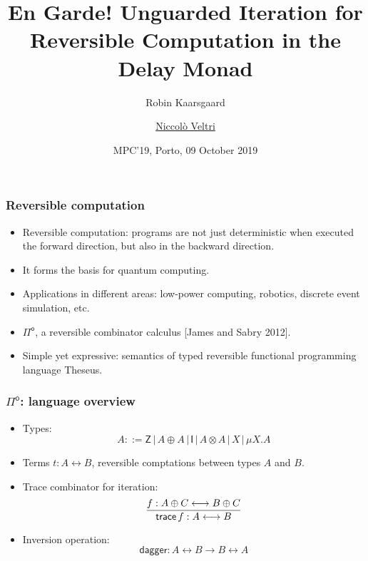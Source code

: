\documentclass[12pt,t]{beamer}
\newcommand{\Pio}{\ensuremath{\mathsf{\Pi}^{\mathsf{o}}}}
\newcommand{\lr}{\longleftrightarrow}
\newcommand{\trace}{\ensuremath{\mathsf{trace}}}
\newcommand{\Z}{\mathsf{Z}}
\newcommand{\I}{\mathsf{I}}
\renewcommand{\dagger}{\mathsf{dagger}}
\begin{document}

\title{En Garde! Unguarded Iteration for Reversible Computation in the
  Delay Monad}


\author{Robin Kaarsgaard \and \underline{Niccol\`o Veltri}}
\date{MPC'19, Porto, 09 October 2019}

\begin{frame}

\maketitle

\end{frame}


\begin{frame}

  \frametitle{Reversible computation}

  \begin{itemize}

  \item Reversible computation: programs are not just deterministic when
    executed the forward direction, but also in the
    backward direction.
  \item It forms the basis for quantum computing.
  \item Applications in different areas: low-power computing, robotics,
    discrete event simulation, etc.

    \pause
    \vspace{\fill}
    
  \item \Pio, a reversible combinator calculus [James and Sabry 2012].
  \item Simple yet expressive: semantics of typed reversible
    functional programming language Theseus.    
  \end{itemize}

\end{frame}

\begin{frame}

  \frametitle{\Pio: language overview}

  \begin{itemize}

  \item Types:
    \[
    A ::= \Z \, | \,A \oplus A \, | \,\I \,| \,A \otimes A \,| \,X \,|
    \,\mu X.A
    \]
  \item Terms $t : A \lr B$, reversible comptations between types $A$
    and $B$.
  \item Trace combinator for iteration:
    \[
    \infer{\trace \,f: A \lr B}{f : A \oplus C \lr B \oplus C}
    \]
  \item Inversion operation:
    \[
    \dagger : A \lr B \to B \lr A
    \]
  \end{itemize}
  
\end{frame}
\end{document}
